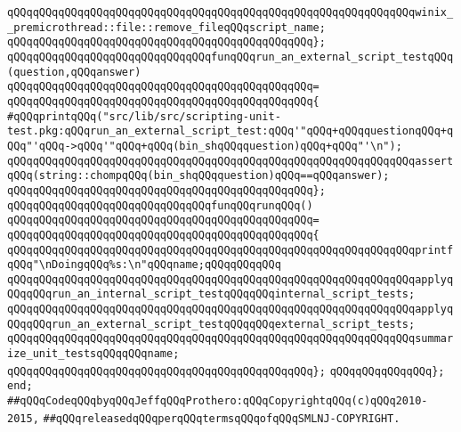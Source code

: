 \verb|qQQqqQQqqQQqqQQqqQQqqQQqqQQqqQQqqQQqqQQqqQQqqQQqqQQqqQQqqQQqqQQqwinix__premicrothread::file::remove_fileqQQqscript_name;|\newline
\verb|qQQqqQQqqQQqqQQqqQQqqQQqqQQqqQQqqQQqqQQqqQQqqQQq};|\newline
\newline
\verb|qQQqqQQqqQQqqQQqqQQqqQQqqQQqqQQqfunqQQqrun_an_external_script_testqQQq(question,qQQqanswer)|\newline
\verb|qQQqqQQqqQQqqQQqqQQqqQQqqQQqqQQqqQQqqQQqqQQqqQQq=|\newline
\verb|qQQqqQQqqQQqqQQqqQQqqQQqqQQqqQQqqQQqqQQqqQQqqQQq{|\newline
\verb|#qQQqprintqQQq("src/lib/src/scripting-unit-test.pkg:qQQqrun_an_external_script_test:qQQq'"qQQq+qQQqquestionqQQq+qQQq"'qQQq->qQQq'"qQQq+qQQq(bin_shqQQqquestion)qQQq+qQQq"'\n");|\newline
\verb|qQQqqQQqqQQqqQQqqQQqqQQqqQQqqQQqqQQqqQQqqQQqqQQqqQQqqQQqqQQqqQQqassertqQQq(string::chompqQQq(bin_shqQQqquestion)qQQq==qQQqanswer);|\newline
\verb|qQQqqQQqqQQqqQQqqQQqqQQqqQQqqQQqqQQqqQQqqQQqqQQq};|\newline
\newline
\verb|qQQqqQQqqQQqqQQqqQQqqQQqqQQqqQQqfunqQQqrunqQQq()|\newline
\verb|qQQqqQQqqQQqqQQqqQQqqQQqqQQqqQQqqQQqqQQqqQQqqQQq=|\newline
\verb|qQQqqQQqqQQqqQQqqQQqqQQqqQQqqQQqqQQqqQQqqQQqqQQq{|\newline
\verb|qQQqqQQqqQQqqQQqqQQqqQQqqQQqqQQqqQQqqQQqqQQqqQQqqQQqqQQqqQQqqQQqprintfqQQq"\nDoingqQQq%s:\n"qQQqname;qQQqqQQqqQQq|\newline
\newline
\verb|qQQqqQQqqQQqqQQqqQQqqQQqqQQqqQQqqQQqqQQqqQQqqQQqqQQqqQQqqQQqqQQqapplyqQQqqQQqrun_an_internal_script_testqQQqqQQqinternal_script_tests;|\newline
\verb|qQQqqQQqqQQqqQQqqQQqqQQqqQQqqQQqqQQqqQQqqQQqqQQqqQQqqQQqqQQqqQQqapplyqQQqqQQqrun_an_external_script_testqQQqqQQqexternal_script_tests;|\newline
\newline
\verb|qQQqqQQqqQQqqQQqqQQqqQQqqQQqqQQqqQQqqQQqqQQqqQQqqQQqqQQqqQQqqQQqsummarize_unit_testsqQQqqQQqname;|\newline
\verb|qQQqqQQqqQQqqQQqqQQqqQQqqQQqqQQqqQQqqQQqqQQqqQQq};|\newline
\verb|qQQqqQQqqQQqqQQq};|\newline
\verb|end;|\newline
\newline
\verb|##qQQqCodeqQQqbyqQQqJeffqQQqProthero:qQQqCopyrightqQQq(c)qQQq2010-2015,|\newline
\verb|##qQQqreleasedqQQqperqQQqtermsqQQqofqQQqSMLNJ-COPYRIGHT.|\newline

